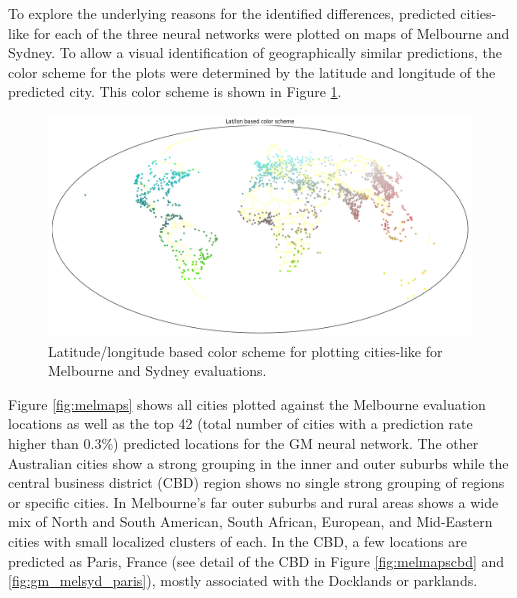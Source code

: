 \documentclass[sageh,times]{sagej}
\begin{document}
To explore the underlying reasons for the identified differences, predicted cities-like for each of the three neural networks were plotted on maps of Melbourne and Sydney. To allow a visual identification of geographically similar predictions, the color scheme for the plots were determined by the latitude and longitude of the predicted city. This color scheme is shown in Figure \ref{fig:colorscheme}. 


\begin{figure}[!htbp]
\centering    
\includegraphics[scale=0.25]{Images/World_map_color_scheme.png} 
\caption{Latitude/longitude based color scheme for plotting cities-like for Melbourne and Sydney evaluations.}    
 \label{fig:colorscheme}  
\end{figure} 


Figure \ref{fig:melmaps} shows all cities plotted against the Melbourne evaluation locations as well as the top 42 (total number of cities with a prediction rate higher than 0.3\%) predicted locations for the GM neural network. The other Australian cities show a strong grouping in the inner and outer suburbs while the central business district (CBD) region shows no single strong grouping of regions or specific cities. In Melbourne's far outer suburbs and rural areas shows a wide mix of North and South American, South African, European, and Mid-Eastern cities with small localized clusters of each. In the CBD, a few locations are predicted as Paris, France (see detail of the CBD in Figure \ref{fig:melmapscbd} and \ref{fig:gm_melsyd_paris}), mostly associated with the Docklands or parklands.
\end{document}
